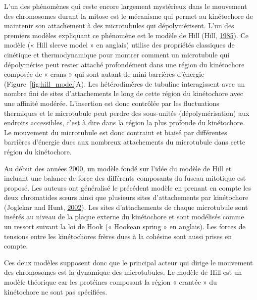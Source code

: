 \documentclass[12pt,a4paper,twoside,openright]{book}
\begin{document}
L'un des phénomènes qui reste encore largement mystérieux dans le
mouvement des chromosomes durant la mitose est le mécanisme qui permet
au kinétochore de maintenir son attachement à des microtubules qui
dépolymérisent. L'un des premiers modèles expliquant ce phénomène est le
modèle de Hill (Hill, \hyperref[ref-Hill1985]{1985}). Ce modèle (« Hill
sleeve model » en anglais) utilise des propriétés classiques de
cinétique et thermodynamique pour montrer comment un microtubule qui
dépolymérise peut rester attaché profondément dans une région du
kinétochore composée de « crans » qui sont autant de mini barrières
d'énergie (Figure~\ref{fig:hill_model}A). Les hétérodimères de tubuline
interagissent avec un nombre fini de sites d'attachements le long de
cette région du kinétochore avec une affinité modérée. L'insertion est
donc contrôlée par les fluctuations thermiques et le microtubule peut
perdre des sous-unités (dépolymérisation) aux endroits accessibles,
c'est à dire dans la région la plus profonde du kinétochore. Le
mouvement du microtubule est donc contraint et biaisé par différentes
barrières d'énergie dues aux nombreux attachements du microtubule dans
cette région du kinétochore.

Au début des années 2000, un modèle fondé sur l'idée du modèle de Hill
et incluant une balance de force des différents composants du fuseau
mitotique est proposé. Les auteurs ont généralisé le précédent modèle en
prenant en compte les deux chromatides sœurs ainsi que plusieurs sites
d'attachements par kinétochore (Joglekar and Hunt,
\hyperref[ref-Joglekar2002]{2002}). Les sites d'attachements de chaque
microtubule sont insérés au niveau de la plaque externe du kinétochore
et sont modélisés comme un ressort suivant la loi de Hook (« Hookean
spring » en anglais). Les forces de tensions entre les kinétochores
frères dues à la cohésine sont aussi prises en compte.

Ces deux modèles supposent donc que le principal acteur qui dirige le
mouvement des chromosomes est la dynamique des microtubules. Le modèle
de Hill est un modèle théorique car les protéines composant la région «
crantée » du kinétochore ne sont pas spécifiées.
\end{document}
